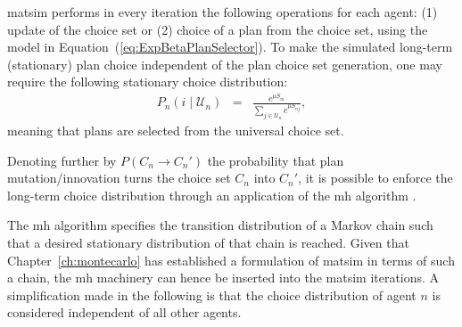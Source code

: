 
\gls{matsim} performs in every iteration the following operations for each
agent: (1) update of the choice set 
or (2) choice of a plan from
the 
choice set, using the model in Equation~(\ref{eq:ExpBetaPlanSelector}).
To make the simulated long-term (stationary) plan choice independent
of the plan choice set generation, one may require the following stationary
choice distribution:
\begin{eqnarray}
P_{n}(i\mid \mathcal{U}_n) & = & \frac{e^{\mu S_{ni}}}{\sum_{j\in \mathcal{U}_n}e^{\mu S_{nj}}},
\label{eq:global-choice-model}
\end{eqnarray}
meaning that plans are selected from the universal choice set.

Denoting further by $P(C_{n}\rightarrow C_{n}')$ the probability
that plan mutation/innovation turns the choice set $C_{n}$ into $C_{n}'$,
it is possible to enforce the long-term choice distribution 
through an application of the \gls{mh} algorithm \citep[][see also \citet{floetteroed-2012b} for a related approach to a similar
problem]{hastings-1970}.

The \gls{mh} algorithm specifies the transition distribution
of a Markov chain such that a desired stationary distribution of that
chain is reached. Given that Chapter~\ref{ch:montecarlo} has established
a formulation of \gls{matsim} in terms of such a chain, the \gls{mh} machinery can
hence be inserted into the \gls{matsim} iterations. A simplification made in
the following is that the choice distribution of agent $n$ is considered
independent of all other agents.

